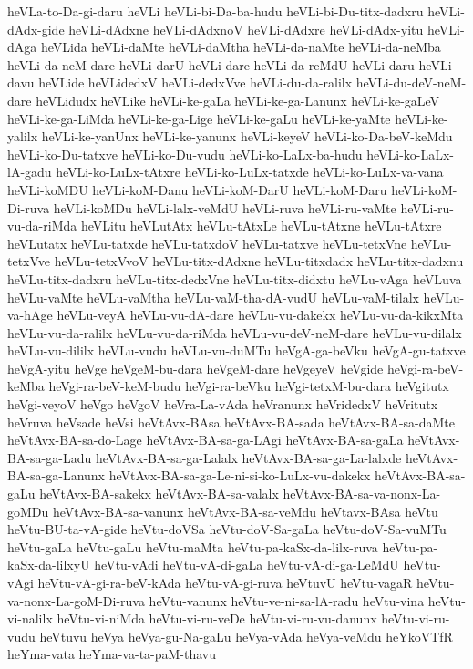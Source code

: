{heVLa-to-Da-gi-daru
heVLi
heVLi-bi-Da-ba-hudu
heVLi-bi-Du-titx-dadxru
heVLi-dAdx-gide
heVLi-dAdxne
heVLi-dAdxnoV
heVLi-dAdxre
heVLi-dAdx-yitu
heVLi-dAga
heVLida
heVLi-daMte
heVLi-daMtha
heVLi-da-naMte
heVLi-da-neMba
heVLi-da-neM-dare
heVLi-darU
heVLi-dare
heVLi-da-reMdU
heVLi-daru
heVLi-davu
heVLide
heVLidedxV
heVLi-dedxVve
heVLi-du-da-ralilx
heVLi-du-deV-neM-dare
heVLidudx
heVLike
heVLi-ke-gaLa
heVLi-ke-ga-Lanunx
heVLi-ke-gaLeV
heVLi-ke-ga-LiMda
heVLi-ke-ga-Lige
heVLi-ke-gaLu
heVLi-ke-yaMte
heVLi-ke-yalilx
heVLi-ke-yanUnx
heVLi-ke-yanunx
heVLi-keyeV
heVLi-ko-Da-beV-keMdu
heVLi-ko-Du-tatxve
heVLi-ko-Du-vudu
heVLi-ko-LaLx-ba-hudu
heVLi-ko-LaLx-lA-gadu
heVLi-ko-LuLx-tAtxre
heVLi-ko-LuLx-tatxde
heVLi-ko-LuLx-va-vana
heVLi-koMDU
heVLi-koM-Danu
heVLi-koM-DarU
heVLi-koM-Daru
heVLi-koM-Di-ruva
heVLi-koMDu
heVLi-lalx-veMdU
heVLi-ruva
heVLi-ru-vaMte
heVLi-ru-vu-da-riMda
heVLitu
heVLutAtx
heVLu-tAtxLe
heVLu-tAtxne
heVLu-tAtxre
heVLutatx
heVLu-tatxde
heVLu-tatxdoV
heVLu-tatxve
heVLu-tetxVne
heVLu-tetxVve
heVLu-tetxVvoV
heVLu-titx-dAdxne
heVLu-titxdadx
heVLu-titx-dadxnu
heVLu-titx-dadxru
heVLu-titx-dedxVne
heVLu-titx-didxtu
heVLu-vAga
heVLuva
heVLu-vaMte
heVLu-vaMtha
heVLu-vaM-tha-dA-vudU
heVLu-vaM-tilalx
heVLu-va-hAge
heVLu-veyA
heVLu-vu-dA-dare
heVLu-vu-dakekx
heVLu-vu-da-kikxMta
heVLu-vu-da-ralilx
heVLu-vu-da-riMda
heVLu-vu-deV-neM-dare
heVLu-vu-dilalx
heVLu-vu-dililx
heVLu-vudu
heVLu-vu-duMTu
heVgA-ga-beVku
heVgA-gu-tatxve
heVgA-yitu
heVge
heVgeM-bu-dara
heVgeM-dare
heVgeyeV
heVgide
heVgi-ra-beV-keMba
heVgi-ra-beV-keM-budu
heVgi-ra-beVku
heVgi-tetxM-bu-dara
heVgitutx
heVgi-veyoV
heVgo
heVgoV
heVra-La-vAda
heVranunx
heVridedxV
heVritutx
heVruva
heVsade
heVsi
heVtAvx-BAsa
heVtAvx-BA-sada
heVtAvx-BA-sa-daMte
heVtAvx-BA-sa-do-Lage
heVtAvx-BA-sa-ga-LAgi
heVtAvx-BA-sa-gaLa
heVtAvx-BA-sa-ga-Ladu
heVtAvx-BA-sa-ga-Lalalx
heVtAvx-BA-sa-ga-La-lalxde
heVtAvx-BA-sa-ga-Lanunx
heVtAvx-BA-sa-ga-Le-ni-si-ko-LuLx-vu-dakekx
heVtAvx-BA-sa-gaLu
heVtAvx-BA-sakekx
heVtAvx-BA-sa-valalx
heVtAvx-BA-sa-va-nonx-La-goMDu
heVtAvx-BA-sa-vanunx
heVtAvx-BA-sa-veMdu
heVtavx-BAsa
heVtu
heVtu-BU-ta-vA-gide
heVtu-doVSa
heVtu-doV-Sa-gaLa
heVtu-doV-Sa-vuMTu
heVtu-gaLa
heVtu-gaLu
heVtu-maMta
heVtu-pa-kaSx-da-lilx-ruva
heVtu-pa-kaSx-da-lilxyU
heVtu-vAdi
heVtu-vA-di-gaLa
heVtu-vA-di-ga-LeMdU
heVtu-vAgi
heVtu-vA-gi-ra-beV-kAda
heVtu-vA-gi-ruva
heVtuvU
heVtu-vagaR
heVtu-va-nonx-La-goM-Di-ruva
heVtu-vanunx
heVtu-ve-ni-sa-lA-radu
heVtu-vina
heVtu-vi-nalilx
heVtu-vi-niMda
heVtu-vi-ru-veDe
heVtu-vi-ru-vu-danunx
heVtu-vi-ru-vudu
heVtuvu
heVya
heVya-gu-Na-gaLu
heVya-vAda
heVya-veMdu
heYkoVTfR
heYma-vata
heYma-va-ta-paM-thavu
}
